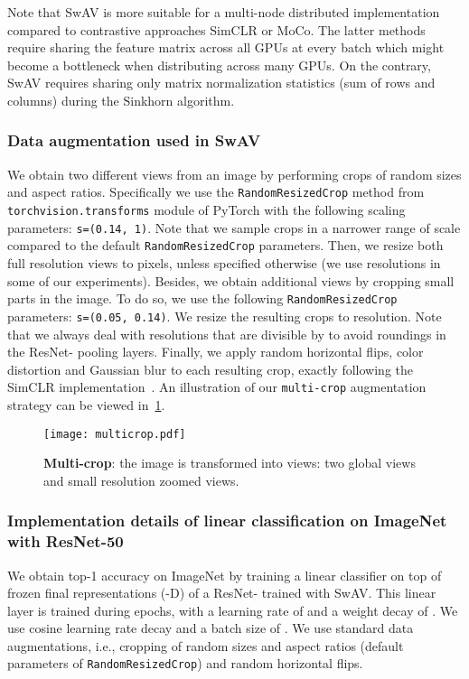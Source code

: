 \documentclass{article}
\def\OURS{SwAV\xspace}
\newcommand{\ImNet}{ImageNet\xspace}
\begin{document}
Note that \OURS is more suitable for a multi-node distributed implementation compared to contrastive approaches SimCLR or MoCo.
The latter methods require sharing the feature matrix across all GPUs at every batch which might become a bottleneck when distributing across many GPUs.
On the contrary, \OURS requires sharing only matrix normalization statistics (sum of rows and columns) during the Sinkhorn algorithm.

\subsubsection{Data augmentation used in \OURS}
We obtain two different views from an image by performing crops of random sizes and aspect ratios.
Specifically we use the \texttt{RandomResizedCrop} method from \texttt{torchvision.transforms} module of PyTorch with the following scaling parameters: \texttt{s=(0.14, 1)}.
Note that we sample crops in a narrower range of scale compared to the default \texttt{RandomResizedCrop} parameters.
Then, we resize both full resolution views to  pixels, unless specified otherwise (we use  resolutions in some of our experiments).
Besides, we obtain  additional views by cropping small parts in the image.
To do so, we use the following \texttt{RandomResizedCrop} parameters: \texttt{s=(0.05, 0.14)}.
We resize the resulting crops to  resolution.
Note that we always deal with resolutions that are divisible by  to avoid roundings in the ResNet- pooling layers.
Finally, we apply random horizontal flips, color distortion and Gaussian blur to each resulting crop, exactly following the SimCLR implementation~\cite{chen2020simple}.
An illustration of our \texttt{multi-crop} augmentation strategy can be viewed in~\cref{fig:multicrop}.

\begin{figure}[h]
\texttt{[image: multicrop.pdf]}
	\caption{\textbf{Multi-crop}: the image  is transformed into  views: two global views and  small resolution zoomed views.}
\label{fig:multicrop}
\end{figure}

\subsubsection{Implementation details of linear classification on \ImNet with ResNet-50}
We obtain  top-1 accuracy on ImageNet by training a linear classifier on top of frozen final representations (-D) of a ResNet- trained with \OURS.
This linear layer is trained during  epochs, with a learning rate of  and a weight decay of .
We use cosine learning rate decay and a batch size of .
We use standard data augmentations, i.e., cropping of random sizes and aspect ratios (default parameters of \texttt{RandomResizedCrop}) and random horizontal flips.
\end{document}
